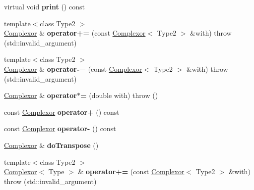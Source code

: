 \begin{DoxyCompactItemize}
virtual void {\bfseries print} () const
\item 
\mbox{\label{classkerbal_1_1math_1_1_complexor_ab08435322609a20b038d30bccc1c4c30}} 
{\footnotesize template$<$class Type2 $>$ }\\\hyperlink{classkerbal_1_1math_1_1_complexor}{Complexor} \& {\bfseries operator+=} (const \hyperlink{classkerbal_1_1math_1_1_complexor}{Complexor}$<$ Type2 $>$ \&with)  throw (std\+::invalid\+\_\+argument)
\item 
\mbox{\label{classkerbal_1_1math_1_1_complexor_ae52bbc17690a5be30daf8f735274a928}} 
{\footnotesize template$<$class Type2 $>$ }\\\hyperlink{classkerbal_1_1math_1_1_complexor}{Complexor} \& {\bfseries operator-\/=} (const \hyperlink{classkerbal_1_1math_1_1_complexor}{Complexor}$<$ Type2 $>$ \&with)  throw (std\+::invalid\+\_\+argument)
\item 
\mbox{\label{classkerbal_1_1math_1_1_complexor_a54b59819042fb04e2c76f52b5d59398d}} 
\hyperlink{classkerbal_1_1math_1_1_complexor}{Complexor} \& {\bfseries operator$\ast$=} (double with)  throw ()
\item 
\mbox{\label{classkerbal_1_1math_1_1_complexor_a5e6cc8577baecb0240f444f30a22092e}} 
const \hyperlink{classkerbal_1_1math_1_1_complexor}{Complexor} {\bfseries operator+} () const
\item 
\mbox{\label{classkerbal_1_1math_1_1_complexor_ac00d269bf93db8b7ffa36d8da800a693}} 
const \hyperlink{classkerbal_1_1math_1_1_complexor}{Complexor} {\bfseries operator-\/} () const
\item 
\mbox{\label{classkerbal_1_1math_1_1_complexor_a01244a006b8088bcc2ebf9529c63e9dc}} 
\hyperlink{classkerbal_1_1math_1_1_complexor}{Complexor} \& {\bfseries do\+Transpose} ()
\item 
\mbox{\label{classkerbal_1_1math_1_1_complexor_a3a4a6aa79372c3da9f5ce8821c526cd3}} 
{\footnotesize template$<$class Type2 $>$ }\\\hyperlink{classkerbal_1_1math_1_1_complexor}{Complexor}$<$ Type $>$ \& {\bfseries operator+=} (const \hyperlink{classkerbal_1_1math_1_1_complexor}{Complexor}$<$ Type2 $>$ \&with)  throw (std\+::invalid\+\_\+argument)

\end{DoxyCompactItemize}
